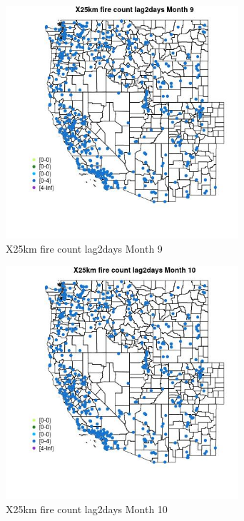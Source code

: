 \begin{figure} 
\centering  
\includegraphics[width=0.77\textwidth]{Code_Outputs/Report_ML_input_PM25_Step4_part_e_de_duplicated_aves_compiled_2019-05-14wNAs_MapObsMo9X25km_fire_count_lag2days.jpg} 
\caption{\label{fig:Report_ML_input_PM25_Step4_part_e_de_duplicated_aves_compiled_2019-05-14wNAsMapObsMo9X25km_fire_count_lag2days}X25km fire count lag2days Month 9} 
\end{figure} 
 

\clearpage 

\begin{figure} 
\centering  
\includegraphics[width=0.77\textwidth]{Code_Outputs/Report_ML_input_PM25_Step4_part_e_de_duplicated_aves_compiled_2019-05-14wNAs_MapObsMo10X25km_fire_count_lag2days.jpg} 
\caption{\label{fig:Report_ML_input_PM25_Step4_part_e_de_duplicated_aves_compiled_2019-05-14wNAsMapObsMo10X25km_fire_count_lag2days}X25km fire count lag2days Month 10} 
\end{figure} 
 

